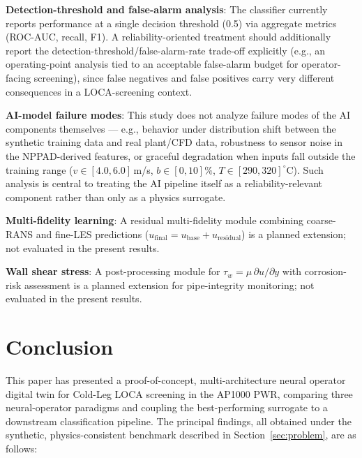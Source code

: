 \documentclass[journal]{IEEEtran}
\begin{document}
\textbf{Detection-threshold and false-alarm analysis}: The classifier currently reports performance at a single decision threshold (0.5) via aggregate metrics (ROC-AUC, recall, F1). A reliability-oriented treatment should additionally report the detection-threshold/false-alarm-rate trade-off explicitly (e.g., an operating-point analysis tied to an acceptable false-alarm budget for operator-facing screening), since false negatives and false positives carry very different consequences in a LOCA-screening context.

\textbf{AI-model failure modes}: This study does not analyze failure modes of the AI components themselves --- e.g., behavior under distribution shift between the synthetic training data and real plant/CFD data, robustness to sensor noise in the NPPAD-derived features, or graceful degradation when inputs fall outside the training range ($v \in [4.0,6.0]$\,m/s, $b\in[0,10]\%$, $T\in[290,320]^\circ$C). Such analysis is central to treating the AI pipeline itself as a reliability-relevant component rather than only as a physics surrogate.

\textbf{Multi-fidelity learning}: A residual multi-fidelity module combining coarse-RANS and fine-LES predictions ($u_\text{final} = u_\text{base} + u_\text{residual}$) is a planned extension; not evaluated in the present results.

\textbf{Wall shear stress}: A post-processing module for $\tau_w = \mu\,\partial u/\partial y$ with corrosion-risk assessment is a planned extension for pipe-integrity monitoring; not evaluated in the present results.

\section{Conclusion}
\label{sec:conclusion}

This paper has presented a proof-of-concept, multi-architecture neural operator digital twin for Cold-Leg LOCA screening in the AP1000 PWR, comparing three neural-operator paradigms and coupling the best-performing surrogate to a downstream classification pipeline. The principal findings, all obtained under the synthetic, physics-consistent benchmark described in Section~\ref{sec:problem}, are as follows:
\end{document}
